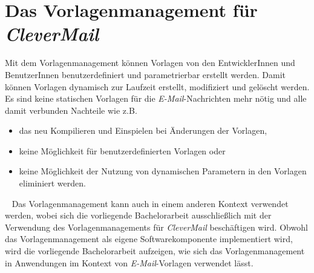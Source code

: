 \section{Das Vorlagenmanagement für \emph{CleverMail}}
Mit dem Vorlagenmanagement können Vorlagen von den EntwicklerInnen und BenutzerInnen benutzerdefiniert und parametrierbar erstellt werden. Damit können Vorlagen dynamisch zur Laufzeit erstellt, modifiziert und gelöscht werden. Es sind keine statischen Vorlagen für die \emph{E-Mail}-Nachrichten mehr nötig und alle damit verbunden Nachteile wie z.B. 
\begin{itemize}
	\item das neu Kompilieren und Einspielen bei Änderungen der Vorlagen,
	\item keine Möglichkeit für benutzerdefinierten Vorlagen oder
	\item keine Möglichkeit der Nutzung von dynamischen Parametern in den Vorlagen eliminiert werden.
\end{itemize}
\ \newline
Das Vorlagenmanagement kann auch in einem anderen Kontext verwendet werden, wobei sich die vorliegende Bachelorarbeit ausschließlich mit der Verwendung des Vorlagenmanagements für \emph{CleverMail} beschäftigen wird. Obwohl das Vorlagenmanagement als eigene Softwarekomponente implementiert wird, wird die vorliegende Bachelorarbeit aufzeigen, wie sich das Vorlagenmanagement in Anwendungen im Kontext von \emph{E-Mail}-Vorlagen verwendet lässt. 
\newpage

